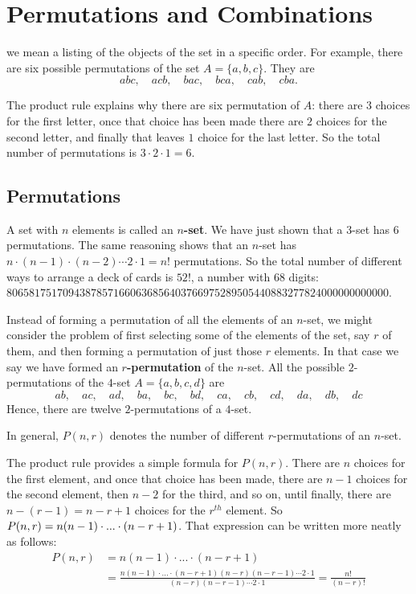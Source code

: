 \chapter{Permutations and Combinations}

 we mean a listing of the objects of the set in
a specific order. For example, there are six possible permutations of the set
$A = \{a,b,c\}$. They are
\[
abc,\quad acb,\quad  bac,\quad bca,\quad cab,\quad cba.
\]

The product rule explains why there are six permutation of $A$: there are
$3$ choices for the first letter, once that choice has been made there are $2$
choices for the second letter, and finally that leaves $1$ choice for the last
letter. So the total number of permutations is $3\cdot2\cdot1 = 6$.

\section{Permutations}
A set with $n$ elements is called an {\bfseries $n$-set}. We have just shown that
a $3$-set has $6$ permutations. The same reasoning shows that an $n$-set
has $n\cdot(n-1)\cdot(n-2)\cdots2\cdot1 = n!$ permutations. So the total
number of different ways to arrange a deck of cards is $52!$,
a number with $68$ digits:
{\color{blue}$80658175170943878571660636856403766975289505440883277824000000000000$}.

Instead of forming a permutation of all the elements of an $n$-set, we might
consider the problem of first selecting some of the elements of the set, say
$r$ of them, and then forming a permutation of just those $r$ elements.
In that case we say we have formed an {\bfseries $r$-permutation} of
the $n$-set. All the possible $2$-permutations of the $4$-set
$A=\{a,b,c,d\}$ are
\[ab,\quad ac,\quad ad,\quad ba,\quad bc,\quad bd,\quad ca,\quad
cb,\quad cd,\quad da, \quad db, \quad dc
\]
Hence, there are twelve $2$-permutations of a $4$-set. 

\begin{notation}
 In general, $P(n,r)$ denotes the number of different
 $r$-permutations of an $n$-set.
\end{notation}

The product rule provides a simple formula for $P(n,r)$.
There are $n$ choices for the first element, and once that choice has been
made, there are $n-1$ choices for the second element, then $n-2$ for the
third, and so on, until finally, there are $n-(r-1) = n-r+1$ choices for the
$r^{th}$ element. So $\displaystyle{P(n,r)=n(n-1)\cdot ...\cdot (n-r+1)}$.
That expression can be written more neatly as follows:
\begin{align*}
 P(n,r)&=n(n-1)\cdot ...\cdot (n-r+1) \\
 &= {\frac{n(n-1)\cdot ...\cdot (n-r+1)(n-r)(n-r-1)\cdots2\cdot1}
 {(n-r)(n-r-1)\cdots2\cdot1}} = {\frac{n!}{(n-r)!}}
\end{align*}

